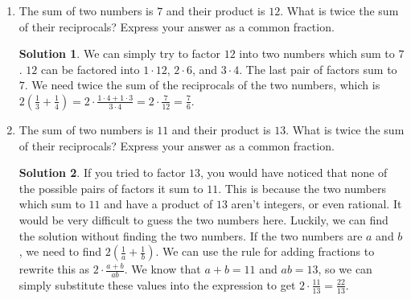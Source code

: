 \documentclass{article}
\theoremstyle{definition}
\newtheorem*{solution}{Solution}
\begin{document}
\begin{enumerate}
\begin{enumerate}
            \item The sum of two numbers is $7$ and their product is $12$. What
            is twice the sum of their reciprocals? Express your answer as a
            common fraction.
            \begin{solution}
                We can simply try to factor $12$ into two numbers which sum to
                $7$. $12$ can be factored into $1 \cdot 12$, $2 \cdot 6$, and $3
                \cdot 4$. The last pair of factors sum to $7$. We need twice the
                sum of the reciprocals of the two numbers, which is
                $2\left(\frac{1}{3} + \frac{1}{4}\right) = 2 \cdot \frac{1 \cdot
                4 + 1 \cdot 3}{3 \cdot 4} = 2 \cdot \frac{7}{12} = \frac{7}{6}$.

            \end{solution}
            \item The sum of two numbers is $11$ and their product is $13$. What
            is twice the sum of their reciprocals? Express your answer as a
            common fraction.
            \begin{solution}
                If you tried to factor $13$, you would have noticed that none of
                the possible pairs of factors it sum to $11$. This is because
                the two numbers which sum to $11$ and have a product of $13$
                aren't integers, or even rational. It would be very difficult to
                guess the two numbers here. Luckily, we can find the solution
                without finding the two numbers. If the two numbers are $a$ and
                $b$, we need to find $2\left(\frac{1}{a} + \frac{1}{b}\right)$.
                We can use the rule for adding fractions to rewrite this as $2
                \cdot \frac{a + b}{ab}$. We know that $a + b = 11$ and $ab =
                13$, so we can simply substitute these values into the
                expression to get $2 \cdot \frac{11}{13} = \frac{22}{13}$.


\end{solution}
\end{enumerate}
\end{enumerate}
\end{document}
